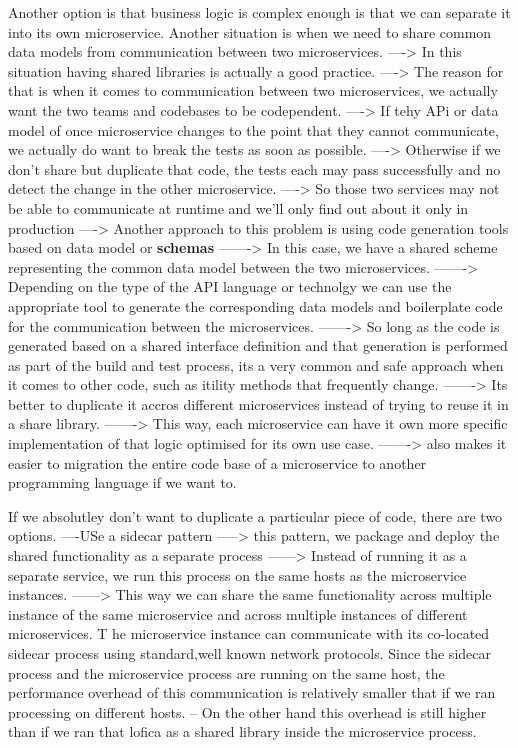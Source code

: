 \documentclass[a4paper, 11pt]{book}
\begin{document}
    Another option is that business logic is complex enough is that we can separate it into its own microservice.
    Another situation is when we need to share common data models from communication between two microservices.
    ----> In this situation having shared libraries is actually a good practice.
    ----> The reason for that is when it comes to communication between two microservices, we actually want the two teams and codebases to be codependent.
    ----> If tehy APi or data model of once microservice changes to the point that they cannot communicate, we actually do want to break the tests as soon as possible.
    ----> Otherwise if we don't share but duplicate that code, the tests each may pass successfully and no detect the change in the other microservice.
    ----> So those two services may not be able to communicate at runtime and we'll only find out about it only in production
    ----> Another approach to this problem is using code generation tools based on data model or \textbf{schemas}
    -------> In this case, we have a shared scheme representing the common data model between the two microservices.
    -------> Depending on the type of the API language or technolgy we can use the appropriate tool to generate the corresponding data models and boilerplate code for the communication between the microservices.
    -------> So long as the code is generated based on a shared interface definition and that generation is performed as part of the build and test process, its a very common and safe approach when it comes to other code, such as itility methods that frequently change.
    -------> Its better to duplicate it accros different microservices instead of trying to reuse it in a share library.
    -------> This way, each microservice can have it own more specific implementation of that logic optimised for its own use case.
    -------> also makes it easier to migration the entire code base of a microservice to another programming language if we want to.

    If we absolutley don't want to duplicate a particular piece of code, there are two options.
    ----USe a sidecar pattern
    -----> this pattern, we package and deploy the shared functionality as a separate process
    ------> Instead of running it as a separate service, we run this process on the same hosts as the microservice instances.
    ------> This way we can share the same functionality across multiple instance of the same microservice and across multiple instances of different microservices.
    T he microservice instance can communicate with its co-located sidecar process using standard,well known network protocols.
    Since the sidecar process and the microservice process are running on the same host, the performance overhead of this communication is relatively smaller that if we ran processing on different hosts.
    -- On the other hand this overhead is still higher than if we ran that lofica as a shared library inside the microservice process.
\end{document}
